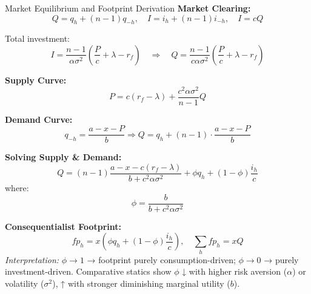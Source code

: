 \documentclass{beamer}
\begin{document}
\begin{frame}{Market Equilibrium and Footprint Derivation}
\footnotesize
\vspace{-2.5em}
\textbf{Market Clearing:}
\[
Q = q_h + (n-1)q_{-h}, \quad I = i_h + (n-1)i_{-h}, \quad I = c Q
\]

Total investment:  
\[
I = \frac{n-1}{\alpha\sigma^2}\left(\frac{P}{c} + \lambda - r_f\right) \quad \Rightarrow \quad Q = \frac{n-1}{c\alpha\sigma^2}\left(\frac{P}{c} + \lambda - r_f\right)
\]

\vspace{0.3em}
\textbf{Supply Curve:}
\[
P = c(r_f - \lambda) + \frac{c^2\alpha\sigma^2}{n-1} Q
\]

\vspace{0.3em}
\textbf{Demand Curve:}
\[
q_{-h} = \frac{a - x - P}{b} \Rightarrow Q = q_h + (n - 1)\cdot \frac{a - x - P}{b} 
\]

\vspace{0.3em}
\textbf{Solving Supply \& Demand:}
\[
Q = (n-1)\frac{a - x - c(r_f - \lambda)}{b + c^2\alpha\sigma^2} + \phi q_h + (1-\phi)\frac{i_h}{c}
\]
where:
\[
\phi = \frac{b}{b + c^2\alpha\sigma^2}
\]

\vspace{0.3em}
\textbf{Consequentialist Footprint:}
\[
fp_h = x\left(\phi q_h + (1-\phi)\frac{i_h}{c}\right), \quad \sum_h fp_h = x Q
\]
\textit{Interpretation:} \(\phi \to 1\) → footprint purely consumption-driven; \(\phi \to 0\) → purely investment-driven. Comparative statics show \(\phi\) ↓ with higher risk aversion (\(\alpha\)) or volatility (\(\sigma^2\)), ↑ with stronger diminishing marginal utility (\(b\)).
\end{frame}
\end{document}
